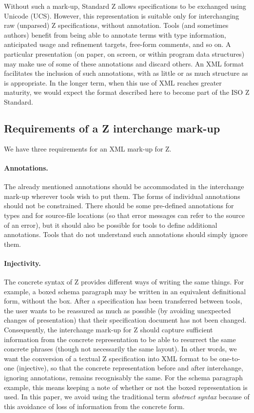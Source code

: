\documentclass{llncs}  %
\begin{document}
Without such a mark-up, Standard Z allows specifications to be exchanged
using Unicode (UCS\cite{ISO10646-1,ISO10646-2}).
However, this representation is suitable only
for interchanging raw (unparsed) Z specifications, without annotation.
Tools (and sometimes authors) benefit from being able to annotate terms
with type information, anticipated usage and refinement targets, free-form
comments, and so on.   A particular presentation (on paper, on screen, or
within program data structures) may make use of some of these annotations
and discard others.  An XML format facilitates the inclusion of such
annotations, with as little or as much structure as is appropriate.  In
the longer term, when this use of XML reaches greater maturity, we would
expect the format described here to become part of the ISO Z Standard.


\subsection{Requirements of a Z interchange mark-up}\label{injectivity}

We have three requirements for an XML mark-up for Z.
 
\paragraph{Annotations.}
The already mentioned annotations should be accommodated
in the interchange mark-up wherever tools wish to put them.
The forms of individual annotations should not be constrained.
There should be some pre-defined annotations for types and for
source-file locations (so that error messages can refer to the
source of an error), but it should also be possible for tools
to define additional annotations.  Tools that do not understand
such annotations should simply ignore them.

\paragraph{Injectivity.}
The concrete syntax of Z provides different ways of writing the 
same things.  For example, a boxed schema paragraph
may be written in an equivalent definitional form, without the box.
After a specification has been transferred between tools, the user wants
to be reassured as much as possible (by avoiding unexpected changes 
of presentation) that their specification document has not been changed.
Consequently, the interchange mark-up for Z should capture
sufficient information from the concrete representation 
to be able to resurrect the same concrete phrases
(though not necessarily the same layout).
In other words, we want the conversion of a textual Z specification into 
XML format to be one-to-one (injective), so that the concrete 
representation before and after interchange, ignoring annotations,
remains recognisably the same.
For the schema paragraph example, this means keeping a note of whether 
or not the boxed representation is used. 
In this paper, we avoid using the traditional term \textit{abstract syntax}
because of this avoidance of loss of information from the concrete form.
\end{document}
